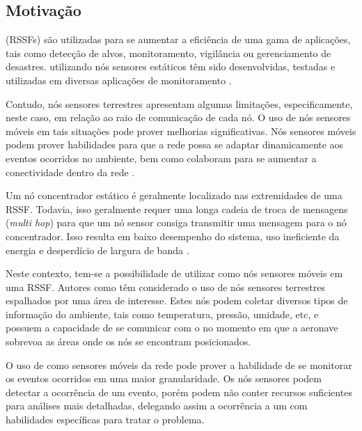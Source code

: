 
\subsection{Motivação}
\wsn (RSSFs) são utilizadas para se aumentar a eficiência de uma gama de
aplicações, tais como detecção de alvos, monitoramento, vigilância ou
gerenciamento de desastres. \rssfs utilizando nós sensores estáticos têm sido
desenvolvidas, testadas e utilizadas em diversas aplicações de monitoramento
\cite{Mainwaring2002}.

Contudo, nós sensores terrestres apresentam algumas limitações, especificamente,
neste caso, em relação ao raio de comunicação de cada nó. O uso de nós sensores
móveis em tais situações pode prover melhorias significativas. Nós sensores
móveis podem prover habilidades para que a rede possa se adaptar dinamicamente
aos eventos ocorridos no ambiente, bem como colaboram para se aumentar a
conectividade dentro da rede  \cite{Aware}.

Um nó concentrador estático é geralmente localizado nas extremidades de uma
RSSF. Todavia, isso geralmente requer uma longa cadeia de troca de mensagens
(\emph{multi hop}) para que um nó sensor consiga transmitir uma mensagem para o
nó concentrador. Isso resulta em baixo desempenho do sistema, uso ineficiente da
energia e desperdício de largura de banda \cite{Chang2007}.

Neste contexto, tem-se a possibilidade de utilizar \vants como nós sensores
móveis em uma RSSF. Autores como \cite{Lucchi2007,Aware} têm considerado o uso de nós
sensores terrestres espalhados por uma área de interesse. Estes nós podem
coletar diversos tipos de informação do ambiente, tais como temperatura,
pressão, umidade, etc, e possuem a capacidade de se comunicar com o \vant no
momento em que a aeronave sobrevoa as áreas onde os nós se encontram
posicionados.

O uso de \vants como sensores móveis da rede pode prover a habilidade de se
monitorar os eventos ocorridos em uma maior granularidade. Os nós sensores podem
detectar a ocorrência de um evento, porém podem não conter recursos suficientes
para análises mais detalhadas, delegando assim a ocorrência a um \vant com
habilidades específicas para tratar o problema.



